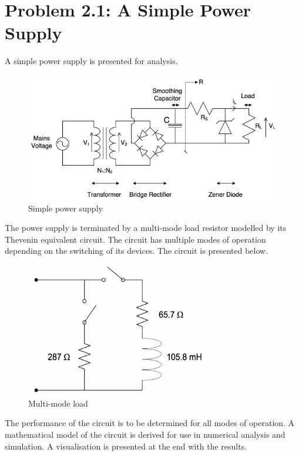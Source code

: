\section*{Problem 2.1: A Simple Power Supply}
A simple power supply is presented for analysis. 
\begin{figure}[H]
    \centering
    \includegraphics[width=\textwidth]{graphics/powersupply.png}
    \caption{Simple power supply}
    \label{fig:powersupply}
\end{figure}
The power supply is terminated by a multi-mode load resistor modelled by its Thevenin equivalent circuit. The circuit has multiple modes of operation depending on the switching of its devices. The circuit is presented below.
\begin{figure}[H]
    \centering
    \includegraphics[width=8cm]{graphics/multimode_load.png}
    \caption{Multi-mode load}
    \label{fig:multimode_load}
\end{figure}
The performance of the circuit is to be determined for all modes of operation. A mathematical model of the circuit is derived for use in numerical analysis and simulation. A visualisation is presented at the end with the results.